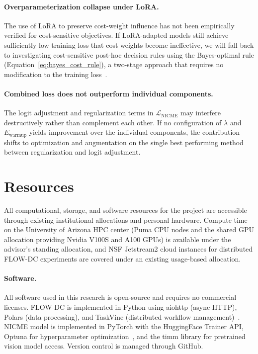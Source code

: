 \documentclass[11pt, letterpaper]{article}
\begin{document}
\paragraph{Overparameterization collapse under LoRA.}
The use of LoRA to preserve cost-weight influence has not been empirically
verified for cost-sensitive objectives. If LoRA-adapted models still achieve
sufficiently low training loss that cost weights become ineffective, we will
fall back to investigating cost-sensitive post-hoc decision rules using the Bayes-optimal
rule (Equation~\ref{eq:bayes_cost_rule}), a two-stage approach that requires no modification to the
training loss~\cite{elkan2001}.

\paragraph{Combined loss does not outperform individual components.}
The logit adjustment and regularization terms in
$\mathcal{L}_{\mathrm{NICME}}$ may interfere destructively rather than
complement each other. If no configuration of $\lambda$ and
$E_{\mathrm{warmup}}$ yields improvement over the individual components, the
contribution shifts to optimization and augmentation on the single best performing method between regularization and logit adjustment.

\section{Resources}
\label{sec:resources}

All computational, storage, and software resources for the project are accessible through existing
institutional allocations and personal hardware. Compute time on the
University of Arizona HPC center (Puma CPU nodes and the shared GPU
allocation providing Nvidia V100S and A100 GPUs) is available under the
advisor's standing allocation, and NSF Jetstream2 cloud instances for
distributed FLOW-DC experiments are covered under an existing usage-based
allocation. 

\paragraph{Software.}
All software used in this research is open-source and requires no commercial
licenses. FLOW-DC is implemented in Python using aiohttp (async HTTP),
Polars (data processing), and TaskVine (distributed workflow
management)~\cite{slydelgado2023taskvine}. NICME model is implemented in PyTorch
with the HuggingFace Trainer API, Optuna for hyperparameter
optimization~\cite{akiba2019optuna}, and the timm library for pretrained vision
model access. Version control is managed through GitHub.
\end{document}
